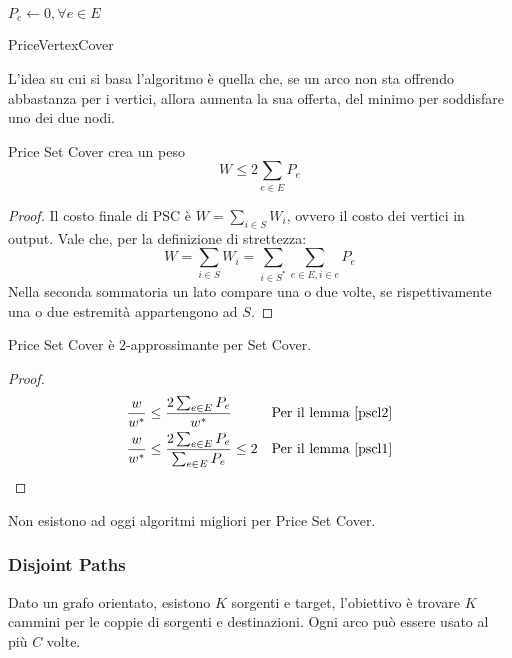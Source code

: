 \begin{algorithm}[H]
    \SetAlgoLined
     $P_e \gets 0, \forall e \in E$\\
     \caption{PriceVertexCover}
\end{algorithm}
L'idea su cui si basa l'algoritmo è quella che, se un arco non sta offrendo abbastanza per i vertici, allora 
aumenta la sua offerta, del minimo per soddisfare uno dei due nodi.
\begin{lemma}
    \label{pscl2}
    Price Set Cover crea un peso $$W \leq 2\sum_{e \in E}P_e$$
\end{lemma}
\begin{proof}
    Il costo finale di PSC è $W = \sum_{i \in S}W_i$, ovvero il costo 
    dei vertici in output. Vale che, per la definizione di strettezza:
    $$W = \sum_{i \in S}W_i = \sum_{i \in S^*} \sum_{e\in E, i \in e}P_e$$
    Nella seconda sommatoria un lato compare una o due volte, se rispettivamente 
    una o due estremità appartengono ad $S$.
\end{proof}
\begin{theorem}
    Price Set Cover è $2$-approssimante per Set Cover.
\end{theorem}
\begin{proof}
    \begin{equation}
        \begin{aligned}
            \frac{w}{w^*} &\leq \frac{2\sum_{e \in E}P_e}{w^*} && \text{Per il lemma \ref{pscl2}}\\
            \frac{w}{w^*} &\leq \frac{2\sum_{e \in E}P_e}{\sum_{e \in E} P_e } \leq 2 && \text{Per il lemma \ref{pscl1}}
        \end{aligned}
    \end{equation}
\end{proof}
\begin{remark}
    Non esistono ad oggi algoritmi migliori per Price Set Cover.
\end{remark}

\subsubsection{Disjoint Paths}
Dato un grafo orientato, esistono $K$ sorgenti e target, l'obiettivo è trovare $K$ cammini per le 
coppie di sorgenti e destinazioni. Ogni arco può essere usato al più $C$ volte.

